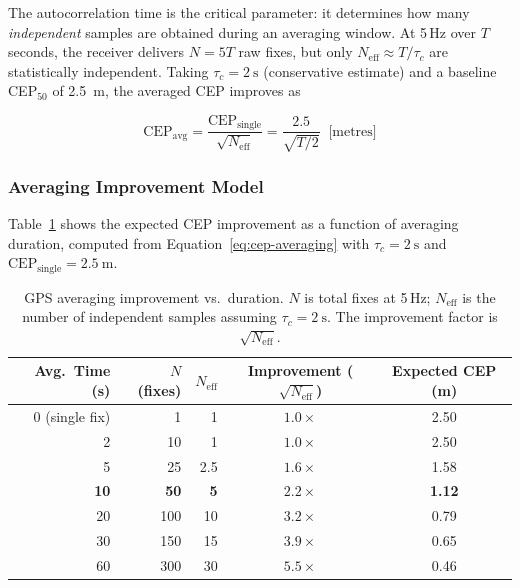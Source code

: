 \noindent The autocorrelation time is the critical parameter: it determines how many \emph{independent} samples are obtained during an averaging window.  At 5\,Hz over $T$ seconds, the receiver delivers $N = 5T$ raw fixes, but only $N_\mathrm{eff} \approx T / \tau_c$ are statistically independent.  Taking $\tau_c = \SI{2}{\second}$ (conservative estimate) and a baseline CEP$_{50}$ of \SI{2.5}{\metre}, the averaged CEP improves as

\begin{equation}\label{eq:cep-averaging}
  \mathrm{CEP}_\mathrm{avg} = \frac{\mathrm{CEP}_\mathrm{single}}{\sqrt{N_\mathrm{eff}}} = \frac{2.5}{\sqrt{T/2}} \;\;\text{[metres]}
\end{equation}

\subsubsection{Averaging Improvement Model}

Table~\ref{tab:gps-averaging} shows the expected CEP improvement as a function of averaging duration, computed from Equation~\ref{eq:cep-averaging} with $\tau_c = \SI{2}{\second}$ and $\mathrm{CEP}_\mathrm{single} = \SI{2.5}{\metre}$.

\begin{table}[H]
  \centering
  \caption{GPS averaging improvement vs.\ duration.  $N$ is total fixes at 5\,Hz; $N_\mathrm{eff}$ is the number of independent samples assuming $\tau_c = \SI{2}{\second}$.  The improvement factor is $\sqrt{N_\mathrm{eff}}$.}
  \label{tab:gps-averaging}
  \begin{tabular}{rrrcc}
    \toprule
    \textbf{Avg.\ Time (s)} & \textbf{$N$ (fixes)} & \textbf{$N_\mathrm{eff}$} & \textbf{Improvement ($\sqrt{N_\mathrm{eff}}$)} & \textbf{Expected CEP (m)} \\
    \midrule
    0 (single fix) & 1  & 1  & $1.0\times$ & 2.50 \\
    2              & 10 & 1  & $1.0\times$ & 2.50 \\
    5              & 25 & 2.5  & $1.6\times$ & 1.58 \\
    \textbf{10}    & \textbf{50} & \textbf{5}  & $\mathbf{2.2\times}$ & \textbf{1.12} \\
    20             & 100 & 10 & $3.2\times$ & 0.79 \\
    30             & 150 & 15 & $3.9\times$ & 0.65 \\
    60             & 300 & 30 & $5.5\times$ & 0.46 \\
    \bottomrule
  \end{tabular}
\end{table}

